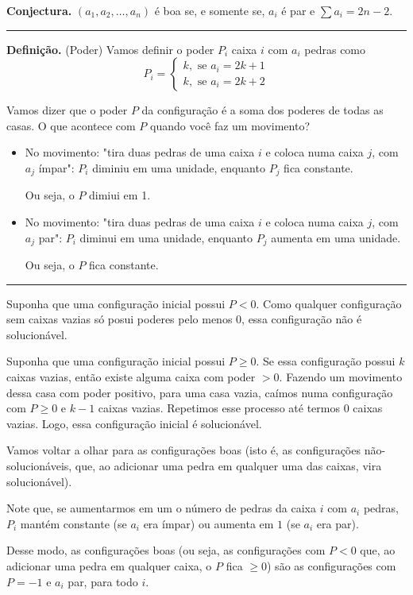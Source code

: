 \documentclass[10pt, a4paper]{article}
\newcommand{\sep}{
	
	\begin{center}
		\vspace{-.6em}
		\rule{10cm}{.5pt}
		\vspace{-.3em}
	\end{center}

}
\begin{document}
	\textbf{Conjectura.} $(a_1, a_2, \dots, a_n)$ é boa se, e somente se, $a_i$ é par e $\sum a_i = 2n - 2$.

	\sep

	\textbf{Definição.} (Poder) Vamos definir o poder $P_i$ caixa $i$ com $a_i$ pedras como
	\[P_i =
		\begin{cases}
			k, \text{ se } a_i = 2k + 1\\
			k, \text{ se } a_i = 2k + 2
		\end{cases}
	\]

	Vamos dizer que o poder $P$ da configuração é a soma dos poderes de todas as casas. O que acontece com $P$ quando você faz um movimento?

	\begin{itemize}
		\item No movimento: "tira duas pedras de uma caixa $i$ e coloca numa caixa $j$, com $a_j$ ímpar":
			$P_i$ diminiu em uma unidade, enquanto $P_j$ fica constante.

			Ou seja, o $P$ dimiui em 1.
		\item No movimento: "tira duas pedras de uma caixa $i$ e coloca numa caixa $j$, com $a_j$ par":
			$P_i$ diminui em uma unidade, enquanto $P_j$ aumenta em uma unidade.

			Ou seja, o $P$ fica constante.
	\end{itemize}

	\sep

	Suponha que uma configuração inicial possui $P < 0$. Como qualquer configuração sem caixas vazias só posui poderes pelo menos $0$, essa configuração não é solucionável.

	Suponha que uma configuração inicial possui $P \ge 0$. Se essa configuração possui $k$ caixas vazias, então existe alguma caixa com poder $>0$. Fazendo um movimento dessa casa com poder positivo, para uma casa vazia, caímos numa configuração com $P \ge 0$ e $k-1$ caixas vazias. Repetimos esse processo até termos $0$ caixas vazias. Logo, essa configuração inicial é solucionável. 

	Vamos voltar a olhar para as configurações boas (isto é, as configurações não-solucionáveis, que, ao adicionar uma pedra em qualquer uma das caixas, vira solucionável).

	Note que, se aumentarmos em um o número de pedras da caixa $i$ com $a_i$ pedras, $P_i$ mantém constante (se $a_i$ era ímpar) ou aumenta em $1$ (se $a_i$ era par).

	Desse modo, as configurações boas (ou seja, as configurações com $P < 0$ que, ao adicionar uma pedra em qualquer caixa, o $P$ fica $\ge 0$) são as configurações com $P = -1$ e $a_i$ par, para todo $i$.
\end{document}

